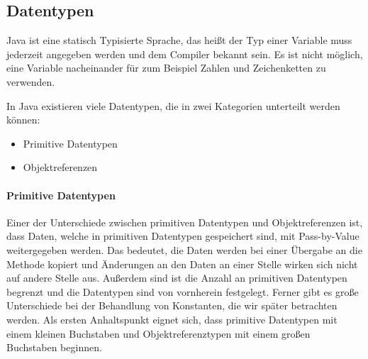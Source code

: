 \subsection{Datentypen}
	
	Java ist eine statisch Typisierte Sprache, das heißt der Typ einer Variable muss jederzeit angegeben werden und dem Compiler bekannt sein. Es ist nicht möglich, eine Variable nacheinander für zum Beispiel Zahlen und Zeichenketten zu verwenden.
	
	In Java existieren viele Datentypen, die in zwei Kategorien unterteilt werden können:
	\begin{itemize}
		\item Primitive Datentypen
		\item Objektreferenzen
	\end{itemize}
	
	\paragraph{Primitive Datentypen}
		Einer der Unterschiede zwischen primitiven Datentypen und Objektreferenzen ist, dass Daten, welche in primitiven Datentypen gespeichert sind, mit Pass-by-Value weitergegeben werden. Das bedeutet, die Daten werden bei einer Übergabe an die Methode kopiert und Änderungen an den Daten an einer Stelle wirken sich nicht auf andere Stelle aus. Außerdem sind ist die Anzahl an primitiven Datentypen begrenzt und die Datentypen sind von vornherein festgelegt. Ferner gibt es große Unterschiede bei der Behandlung von Konstanten, die wir später betrachten werden.  Als ersten Anhaltspunkt eignet sich, dass primitive Datentypen mit einem kleinen Buchstaben und Objektreferenztypen mit einem großen Buchstaben beginnen.
		
